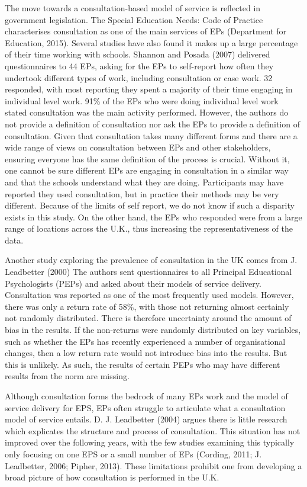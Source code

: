 \documentclass[
  english,
  man]{apa7}
\begin{document}
The move towards a consultation-based model of service is reflected in government legislation. The Special Education Needs: Code of Practice characterises consultation as one of the main services of EPs (Department for Education, 2015). Several studies have also found it makes up a large percentage of their time working with schools. Shannon and Posada (2007) delivered questionnaires to 44 EPs, asking for the EPs to self-report how often they undertook different types of work, including consultation or case work. 32 responded, with most reporting they spent a majority of their time engaging in individual level work. 91\% of the EPs who were doing individual level work stated consultation was the main activity performed. However, the authors do not provide a definition of consultation nor ask the EPs to provide a definition of consultation. Given that consultation takes many different forms and there are a wide range of views on consultation between EPs and other stakeholders, ensuring everyone has the same definition of the process is crucial. Without it, one cannot be sure different EPs are engaging in consultation in a similar way and that the schools understand what they are doing. Participants may have reported they used consultation, but in practice their methods may be very different. Because of the limits of self report, we do not know if such a disparity exists in this study. On the other hand, the EPs who responded were from a large range of locations across the U.K., thus increasing the representativeness of the data.

Another study exploring the prevalence of consultation in the UK comes from J. Leadbetter (2000) The authors sent questionnaires to all Principal Educational Psychologists (PEPs) and asked about their models of service delivery. Consultation was reported as one of the most frequently used models. However, there was only a return rate of 58\%, with those not returning almost certainly not randomly distributed. There is therefore uncertainty around the amount of bias in the results. If the non-returns were randomly distributed on key variables, such as whether the EPs has recently experienced a number of organisational changes, then a low return rate would not introduce bias into the results. But this is unlikely. As such, the results of certain PEPs who may have different results from the norm are missing.

Although consultation forms the bedrock of many EPs work and the model of service delivery for EPS, EPs often struggle to articulate what a consultation model of service entails. D. J. Leadbetter (2004) argues there is little research which explicates the structure and process of consultation. This situation has not improved over the following years, with the few studies examining this typically only focusing on one EPS or a small number of EPs (Cording, 2011; J. Leadbetter, 2006; Pipher, 2013). These limitations prohibit one from developing a broad picture of how consultation is performed in the U.K.
\end{document}
